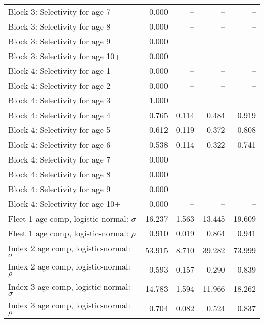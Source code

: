 \documentclass[
]{article}
\begin{document}
\begin{landscape}
\begin{longtable}[t]{lrrrr}
Block 3: Selectivity for age 7 & 0.000 & -- & -- & --\\
Block 3: Selectivity for age 8 & 0.000 & -- & -- & --\\
Block 3: Selectivity for age 9 & 0.000 & -- & -- & --\\
Block 3: Selectivity for age 10+ & 0.000 & -- & -- & --\\
\addlinespace
Block 4: Selectivity for age 1 & 0.000 & -- & -- & --\\
Block 4: Selectivity for age 2 & 0.000 & -- & -- & --\\
Block 4: Selectivity for age 3 & 1.000 & -- & -- & --\\
Block 4: Selectivity for age 4 & 0.765 & 0.114 & 0.484 & 0.919\\
Block 4: Selectivity for age 5 & 0.612 & 0.119 & 0.372 & 0.808\\
\addlinespace
Block 4: Selectivity for age 6 & 0.538 & 0.114 & 0.322 & 0.741\\
Block 4: Selectivity for age 7 & 0.000 & -- & -- & --\\
Block 4: Selectivity for age 8 & 0.000 & -- & -- & --\\
Block 4: Selectivity for age 9 & 0.000 & -- & -- & --\\
Block 4: Selectivity for age 10+ & 0.000 & -- & -- & --\\
\addlinespace
Fleet 1 age comp, logistic-normal: $\sigma$ & 16.237 & 1.563 & 13.445 & 19.609\\
Fleet 1 age comp, logistic-normal: $\rho$ & 0.910 & 0.019 & 0.864 & 0.941\\
Index 2 age comp, logistic-normal: $\sigma$ & 53.915 & 8.710 & 39.282 & 73.999\\
Index 2 age comp, logistic-normal: $\rho$ & 0.593 & 0.157 & 0.290 & 0.839\\
Index 3 age comp, logistic-normal: $\sigma$ & 14.783 & 1.594 & 11.966 & 18.262\\
\addlinespace
Index 3 age comp, logistic-normal: $\rho$ & 0.704 & 0.082 & 0.524 & 0.837\\*
\end{longtable}
\end{landscape}
\end{document}
